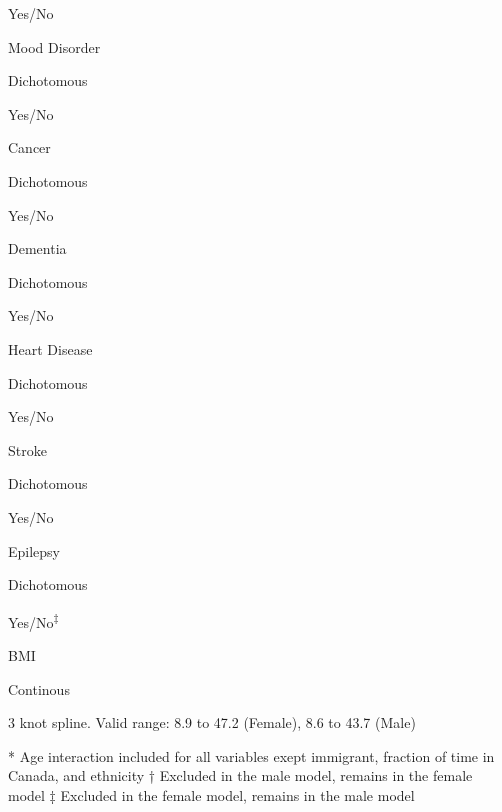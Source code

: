 \documentclass[]{book}
\begin{document}
Yes/No

Mood Disorder

Dichotomous

Yes/No

Cancer

Dichotomous

Yes/No

Dementia

Dichotomous

Yes/No

Heart Disease

Dichotomous

Yes/No

Stroke

Dichotomous

Yes/No

Epilepsy

Dichotomous

Yes/No\textsuperscript{‡}

BMI

Continous

3 knot spline. Valid range: 8.9 to 47.2 (Female), 8.6 to 43.7 (Male)

* Age interaction included for all variables exept immigrant, fraction
of time in Canada, and ethnicity † Excluded in the male model, remains
in the female model ‡ Excluded in the female model, remains in the male
model


\end{document}
